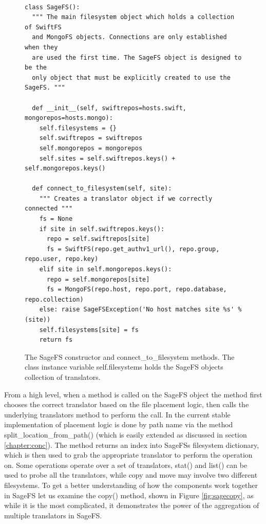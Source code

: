 \begin{figure}[h]
\begin{lstlisting}

class SageFS():
  """ The main filesystem object which holds a collection of SwiftFS
  and MongoFS objects. Connections are only established when they
  are used the first time. The SageFS object is designed to be the 
  only object that must be explicitly created to use the SageFS. """

  def __init__(self, swiftrepos=hosts.swift, mongorepos=hosts.mongo):
    self.filesystems = {}
    self.swiftrepos = swiftrepos
    self.mongorepos = mongorepos
    self.sites = self.swiftrepos.keys() + self.mongorepos.keys()

  def connect_to_filesystem(self, site):
    """ Creates a translator object if we correctly connected """
    fs = None
    if site in self.swiftrepos.keys():
      repo = self.swiftrepos[site]
      fs = SwiftFS(repo.get_authv1_url(), repo.group, repo.user, repo.key)
    elif site in self.mongorepos.keys():
      repo = self.mongorepos[site]
      fs = MongoFS(repo.host, repo.port, repo.database, repo.collection)
    else: raise SageFSException('No host matches site %s' % (site))
    self.filesystems[site] = fs
    return fs

\end{lstlisting}
\caption[SageFS Constructor]{The SageFS constructor and connect\_to\_filesystem methods. The class instance variable self.filesystems holds the SageFS objects collection of translators.}
\label{fig:sagefscode}
\end{figure}


From a high level, when a method is called on the SageFS object the method
first chooses the correct translator based on the file placement logic, then calls the
underlying translators method to perform the call. In the current stable
implementation of placement logic is done by path name via the method
split\_location\_from\_path() (which is easily extended as discussed in section
\ref{chapter:conc}). The method returns an index into SageFSs filesystem
dictionary, which is then used to grab the appropriate translator to perform the
operation on. Some operations operate over a set of translators, stat() and list() can
be used to probe all the translators, while copy and move may involve two different
filesystems. To get a better understanding of how the components work together
in SageFS let us examine the copy() method, shown in Figure \ref{fig:sagecopy}, as while it is the most
complicated, it demonstrates the power of the aggregation of multiple translators in
SageFS.

